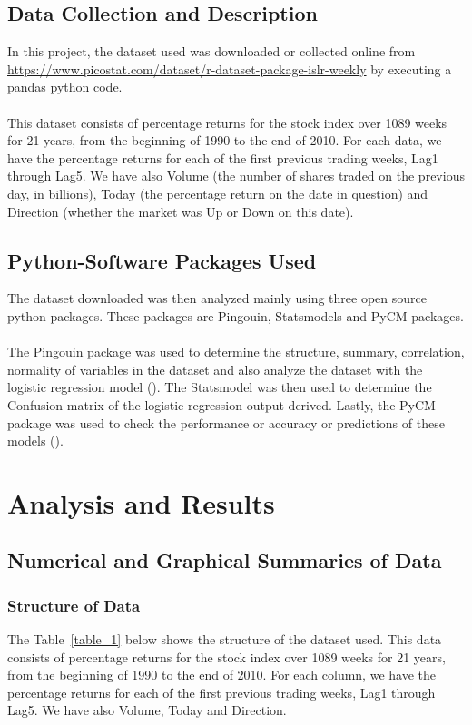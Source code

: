 \documentclass[12pt]{article}
\begin{document}
\subsection{Data Collection and Description}
In this project, the dataset used was downloaded or collected online from \url{https://www.picostat.com/dataset/r-dataset-package-islr-weekly} by executing a pandas python code. \\\\
This dataset consists of percentage returns for the stock index over 1089 weeks for 21 years, from the beginning of 1990 to the end of 2010.  For each data,  we have the percentage returns for each of the  first previous trading weeks, Lag1 through Lag5.  We have also Volume (the number of shares traded on the previous day, in billions), Today (the percentage return on the date in question) and Direction (whether the market was Up or Down on this date). 

\subsection{Python-Software Packages Used}
The dataset downloaded was then analyzed mainly using three open source python packages. These packages are Pingouin, Statsmodels and PyCM packages. \\\\
The Pingouin package was used to determine the structure, summary, correlation, normality of variables in the dataset and also analyze the dataset with the logistic regression model (\cite{ref-software}). The Statsmodel was then used to determine the Confusion matrix of the logistic regression output derived. Lastly, the PyCM package was used to check the performance or accuracy or predictions of these models (\cite{ref-softwaree}).


\section{Analysis and Results}
\subsection{Numerical and Graphical Summaries of Data}

\subsubsection{Structure of Data}
The Table~\ref{table_1} below shows the structure of the dataset used. This data consists of percentage returns for the stock index over 1089 weeks for 21 years, from the beginning of 1990 to the end of 2010. For each column, we have the percentage returns for each of the first previous trading weeks, Lag1 through Lag5. We have also Volume, Today and Direction. 
\end{document}
